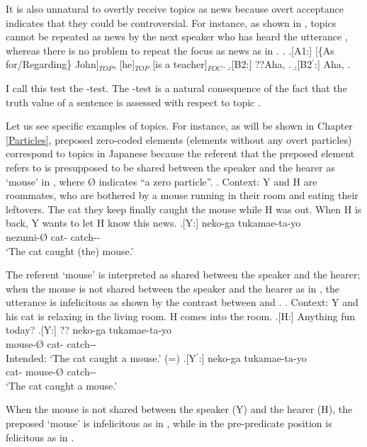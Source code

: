 It is also unnatural to overtly receive topics as news
because overt acceptance indicates that they could be controversial.
For instance, as shown in \Next[B2],
topics cannot be repeated as news by the next speaker who has heard the utterance \Next[A1],
whereas there is no problem to repeat the focus as news as in \Next[B2$^{\prime}$].
%
\ex.\label{aha} \a.[A1:] [\{As for/Regarding\} John]$_{TOP}$, [he]$_{TOP}$ [is a teacher]$_{FOC}$.
     \b.[B2:] ??Aha, .
     \b.[B2$^{\prime}$:] Aha, .

I call this test the -test.
The -test is a natural consequence of the fact that
the truth value of a sentence is assessed with respect to topic \cite{strawson64}.

Let us see specific examples of topics.
For instance,
as will be shown in Chapter \ref{Particles},
preposed zero-coded elements (elements without any overt particles) correspond to topics in Japanese
because the referent that the preposed element refers to is presupposed to be shared between the speaker and the hearer as  `mouse' in \Next,
where {\O} indicates ``a zero particle''.
	\ex. \label{FrameworkExMouse}Context: Y and H are roommates,
		who are bothered by a mouse running in their room
		and eating their leftovers.
		The cat they keep finally caught the mouse while H was out.
		When H is back, Y wants to let H know this news.
		\ag.[Y:]  neko-ga tukamae-ta-yo \\
			nezumi-{\O} cat- catch-- \\
			`The cat caught (the) mouse.'
	
The referent `mouse' is interpreted as shared between the speaker and the hearer;
when the mouse is not shared between the speaker and the hearer as in \Next,
the utterance is infelicitous as shown by the contrast between \Next[Y] and \Next[Y$^{\prime}$].
	\ex. \label{TopDef}Context: Y and his cat is relaxing in the living room.
		H comes into the room.
		\a.[H:] Anything fun today?
		\bg.[Y:] ?? neko-ga tukamae-ta-yo \\
			mouse-{\O} cat- catch-- \\
			Intended: `The cat caught a mouse.' \hfill{(=\LLast[Y])}
		\bg.[Y$^{\prime}$:] neko-ga  tukamae-ta-yo \\
			cat- mouse-{\O} catch-- \\
			`The cat caught a mouse.'

When the mouse is not shared between the speaker (Y) and the hearer (H),
the preposed  `mouse' is infelicitous as in \Last[Y],
while  in the pre-predicate position is felicitous as in \Last[Y$^{\prime}$].

